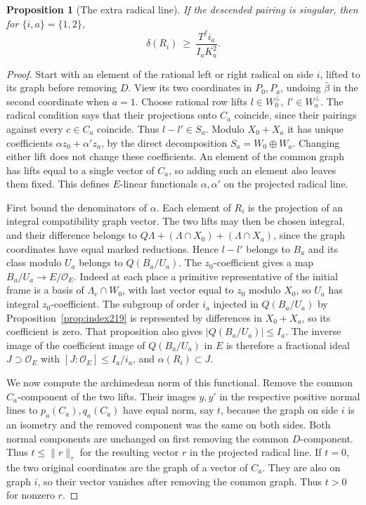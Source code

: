 \documentclass[a4paper,11pt]{article}
\newtheorem{proposition}{Proposition}[section]
\theoremstyle{definition}
\theoremstyle{remark}
\numberwithin{equation}{section}
\newcommand{\OO}{\mathcal O}
\begin{document}
\begin{proposition}[The extra radical line]
\label{prop:radical223}
If the descended pairing is singular, then for
\(\{i,a\}=\{1,2\}\),
\begin{equation}
                \delta(R_i)\ \ge\
                  \frac{T^f i_a}{I_a K_a^2}.
                \label{eq:radical223}
\end{equation}
\end{proposition}
\begin{proof}
Start with an element of the rational left or right radical
on side \(i\), lifted to its graph before removing \(D\).
View its two coordinates in \(P_0,P_a\), undoing
\(\bar\beta\) in the second coordinate when \(a=1\).
Choose rational row lifts \(l\in W_0^\perp,\ l'\in W_a^\perp\).
The radical condition says that their projections onto
\(C_a\) coincide, since their pairings against every
\(c\in C_a\) coincide. Thus \(l-l'\in S_a\). Modulo
\(X_0+X_a\) it has unique coefficients
\(\alpha z_0+\alpha' z_a\), by the direct decomposition
\(S_a=W_0\oplus W_a\). Changing either lift does not change
these coefficients. An element of the common graph has
lifts equal to a single vector of \(C_a\), so adding such
an element also leaves them fixed. This defines \(E\)-linear
functionals \(\alpha,\alpha'\) on the projected radical line.

First bound the denominators of \(\alpha\). Each element of
\(R_i\) is the projection of an integral compatibility graph
vector. The two lifts may then be chosen integral, and
their difference belongs to
\(Q\Lambda+(\Lambda\cap X_0)+(\Lambda\cap X_a)\), since the
graph coordinates have equal marked reductions. Hence
\(l-l'\) belongs to \(B_a\) and its class modulo \(U_a\)
belongs to \(Q(B_a/U_a)\). The \(z_0\)-coefficient gives a
map \(B_a/U_a\to E/\OO_E\). Indeed at each place a
primitive representative of the initial frame is a basis
of \(\Lambda_v\cap W_0\), with last vector equal to \(z_0\)
modulo \(X_0\), so \(U_a\) has integral \(z_0\)-coefficient.
The subgroup of order \(i_a\) injected in \(Q(B_a/U_a)\)
by Proposition~\ref{prop:index219} is represented by
differences in \(X_0+X_a\), so its coefficient is zero.
That proposition also gives \(|Q(B_a/U_a)|\le I_a\).
The inverse image of the coefficient image of \(Q(B_a/U_a)\)
in \(E\) is therefore a fractional ideal \(J\supset\OO_E\)
with \([J:\OO_E]\le I_a/i_a\), and \(\alpha(R_i)\subset J\).

We now compute the archimedean norm of this functional.
Remove the common \(C_a\)-component of the two lifts. Their
images \(y,y'\) in the respective positive normal lines to
\(p_a(C_a),q_a(C_a)\) have equal norm, say \(t\), because
the graph on side \(i\) is an isometry and the removed
component was the same on both sides. Both normal components
are unchanged on first removing the common \(D\)-component.
Thus \(t\le\|r\|_\tau\) for the resulting vector \(r\)
in the projected radical line. If \(t=0\), the two original
coordinates are the graph of a vector of \(C_a\). They are
also on graph \(i\), so their vector vanishes after removing
the common graph. Thus \(t>0\) for nonzero \(r\).


\end{proof}
\end{document}
